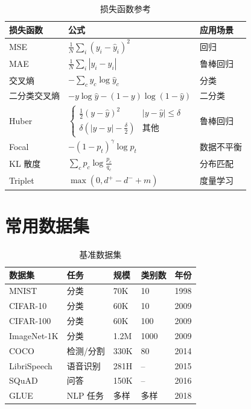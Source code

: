 \begin{table}[ht]
    \centering
    \caption{损失函数参考}
    \begin{tabular}{L{2.5cm} L{5cm} L{4.5cm}}
        \toprule
        \textbf{损失函数} & \textbf{公式} & \textbf{应用场景} \\
        \midrule
        MSE & $\frac{1}{N}\sum_{i}(y_i - \hat{y}_i)^2$ & 回归 \\
        MAE & $\frac{1}{N}\sum_{i}|y_i - \hat{y}_i|$ & 鲁棒回归 \\
        交叉熵 & $-\sum_c y_c \log\hat{y}_c$ & 分类 \\
        二分类交叉熵 & $-y\log\hat{y} - (1-y)\log(1-\hat{y})$ & 二分类 \\
        Huber & $\begin{cases}\frac{1}{2}(y-\hat{y})^2 & |y-\hat{y}| \leq \delta \\ \delta(|y-\hat{y}|-\frac{\delta}{2}) & \text{其他}\end{cases}$ & 鲁棒回归 \\
        Focal & $-(1-p_t)^\gamma \log p_t$ & 数据不平衡 \\
        KL 散度 & $\sum_c p_c \log\frac{p_c}{q_c}$ & 分布匹配 \\
        Triplet & $\max(0, d^+ - d^- + m)$ & 度量学习 \\
        \bottomrule
    \end{tabular}
\end{table}

\section{常用数据集}

\begin{table}[ht]
    \centering
    \caption{基准数据集}
    \begin{tabular}{L{2cm} L{2cm} L{2cm} L{3cm} L{2.5cm}}
        \toprule
        \textbf{数据集} & \textbf{任务} & \textbf{规模} & \textbf{类别数} & \textbf{年份} \\
        \midrule
        MNIST & 分类 & 70K & 10 & 1998 \\
        CIFAR-10 & 分类 & 60K & 10 & 2009 \\
        CIFAR-100 & 分类 & 60K & 100 & 2009 \\
        ImageNet-1K & 分类 & 1.2M & 1000 & 2009 \\
        COCO & 检测/分割 & 330K & 80 & 2014 \\
        LibriSpeech & 语音识别 & 281H & -- & 2015 \\
        SQuAD & 问答 & 150K & -- & 2016 \\
        GLUE & NLP 任务 & 多样 & 多样 & 2018 \\
        \bottomrule
    \end{tabular}
\end{table}

